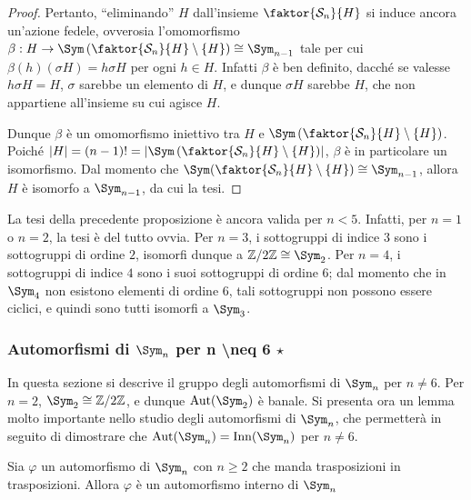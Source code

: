 \documentclass[11pt]{scrartcl}
\begin{document}
\begin{proof}
		
		Pertanto, ``eliminando'' $H$
		dall'insieme $\faktor{\mathcal{S}_n}{H}$ si induce ancora un'azione fedele, ovverosia
		l'omomorfismo $\beta : H \to \Sym\left(\faktor{\mathcal{S}_n}{H} \setminus \{H\}\right) \cong \Sym_{n-1}$
		tale per cui $\beta(h)(\sigma H) = h \sigma H$ per ogni $h \in H$. Infatti $\beta$ è ben definito,
		dacché se valesse $h \sigma H = H$, $\sigma$ sarebbe un elemento di $H$, e dunque $\sigma H$ sarebbe
		$H$, che non appartiene all'insieme su cui agisce $H$. \medskip
		
		
		Dunque $\beta$ è un omomorfismo iniettivo tra $H$ e $\Sym\left(\faktor{\mathcal{S}_n}{H} \setminus \{H\}\right)$. Poiché $\abs{H} = (n-1)! = \abs{\Sym\left(\faktor{\mathcal{S}_n}{H} \setminus \{H\}\right)}$, $\beta$ è in particolare un isomorfismo. 
		Dal momento che $\Sym(\faktor{\mathcal{S}_n}{H} \setminus \{H\}) \cong
		\Sym_{n-1}$, allora $H$ è isomorfo a $\Sym_{n-1}$, da cui la tesi.
	\end{proof}
	
	\begin{remark}
		La tesi della precedente proposizione è ancora valida per $n < 5$. Infatti, per $n = 1$
		o $n = 2$, la tesi è del tutto ovvia. Per $n = 3$, i sottogruppi di indice $3$ sono
		i sottogruppi di ordine $2$, isomorfi dunque a $\Z{2} \cong \Sym_2$. Per $n = 4$, i
		sottogruppi di indice $4$ sono i suoi sottogruppi di ordine $6$; dal momento che in $\Sym_4$ non
		esistono elementi di ordine $6$, tali sottogruppi non possono essere ciclici, e quindi sono
		tutti isomorfi a $\Sym_3$.
	\end{remark}
	
	\subsubsection{Automorfismi di $\Sym_n$ per \texorpdfstring{n \textbackslash neq 6}{n≠6} \texorpdfstring{$\star$}{★}}
	
	
	In questa sezione si descrive il gruppo degli automorfismi di $\Sym_n$ per $n \neq 6$.
	Per $n = 2$, $\Sym_2 \cong \Z{2}$, e dunque $\Aut(\Sym_2)$ è banale. Si presenta
	ora un lemma molto importante nello studio degli automorfismi di $\Sym_n$, che permetterà
	in seguito di dimostrare che $\Aut(\Sym_n) = \Inn(\Sym_n)$ per $n \neq 6$.
	
	\begin{lemma}
		\label{lemma:trasp_in_trasp}
		Sia $\varphi$ un automorfismo di $\Sym_n$ con $n \geq 2$ che manda trasposizioni in trasposizioni.
		Allora $\varphi$ è un automorfismo interno di $\Sym_n$
	\end{lemma}
	
\end{document}
